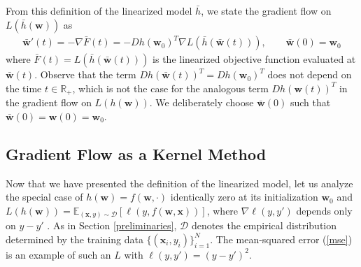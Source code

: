 \documentclass{article}
\begin{document}
From this definition of the linearized model $\bar{h}$, we state the gradient flow on $L(\bar{h}(\boldsymbol{w}))$ as 
\begin{align*}
    \boldsymbol{\bar{w}}'(t) = -\nabla \bar{F}(t) = - Dh(\boldsymbol{w}_0)^T \nabla L(\bar{h}(\boldsymbol{\bar{w}}(t))), \qquad \boldsymbol{\bar{w}}(0) = \boldsymbol{w}_0
\end{align*}
where $\bar{F}(t) = L(\bar{h}(\boldsymbol{\bar{w}}(t)))$ is the linearized objective function evaluated at $\boldsymbol{\bar{w}}(t)$. Observe that the term $Dh(\boldsymbol{\bar{w}}(t))^T = Dh(\boldsymbol{w}_0)^T$ does not depend on the time $t \in \mathbb{R}_+$, which is not the case for the analogous term $Dh(\boldsymbol{w}(t))^T$ in the gradient flow on $L(h(\boldsymbol{w}))$. We deliberately choose $\boldsymbol{\bar{w}}(0)$ such that $\boldsymbol{\bar{w}}(0) = \boldsymbol{w}(0) = \boldsymbol{w}_0$.

\subsection{Gradient Flow as a Kernel Method}\label{kernelmethod}

Now that we have presented the definition of the linearized model, let us analyze the special case of $h(\boldsymbol{w}) = f(\boldsymbol{w}, \cdot)$ identically zero at its initialization $\boldsymbol{w}_0$ and $L(h(\boldsymbol{w})) = \mathbb{E}_{(\boldsymbol{x}, y) \sim \mathcal{D}} [\ell(y, f(\boldsymbol{w}, \boldsymbol{x}))]$, where $\nabla \ell(y, y')$ depends only on $y - y'$ \cite{chizat2018note}. As in Section \ref{preliminaries}, $\mathcal{D}$ denotes the empirical distribution determined by the training data $\{ (\boldsymbol{x}_i, y_i) \}_{i=1}^N$. The mean-squared error (\ref{mse}) is an example of such an $L$ with $\ell(y, y') = (y - y')^2$. 
\end{document}
